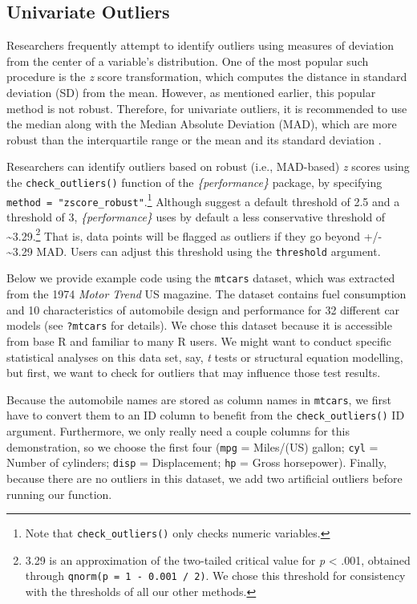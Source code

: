 \documentclass[sn-basic, lineno,pdflatex]{sn-jnl}
\begin{document}
\hypertarget{univariate-outliers}{%
\subsection{Univariate Outliers}\label{univariate-outliers}}

Researchers frequently attempt to identify outliers using measures of
deviation from the center of a variable's distribution. One of the most
popular such procedure is the \emph{z} score transformation, which
computes the distance in standard deviation (SD) from the mean. However,
as mentioned earlier, this popular method is not robust. Therefore, for
univariate outliers, it is recommended to use the median along with the
Median Absolute Deviation (MAD), which are more robust than the
interquartile range or the mean and its standard deviation
\citep{leys2019outliers, leys2013outliers}.

Researchers can identify outliers based on robust (i.e., MAD-based)
\emph{z} scores using the \texttt{check\_outliers()} function of the
\emph{\{performance\}} package, by specifying
\texttt{method\ =\ "zscore\_robust"}.\footnote{Note that
  \texttt{check\_outliers()} only checks numeric variables.} Although
\citet{leys2013outliers} suggest a default threshold of 2.5 and
\citet{leys2019outliers} a threshold of 3, \emph{\{performance\}} uses
by default a less conservative threshold of
\textasciitilde3.29.\footnote{3.29 is an approximation of the two-tailed
  critical value for \emph{p} \textless{} .001, obtained through
  \texttt{qnorm(p\ =\ 1\ -\ 0.001\ /\ 2)}. We chose this threshold for
  consistency with the thresholds of all our other methods.} That is,
data points will be flagged as outliers if they go beyond +/-
\textasciitilde3.29 MAD. Users can adjust this threshold using the
\texttt{threshold} argument.

Below we provide example code using the \texttt{mtcars} dataset, which
was extracted from the 1974 \emph{Motor Trend} US magazine. The dataset
contains fuel consumption and 10 characteristics of automobile design
and performance for 32 different car models (see \texttt{?mtcars} for
details). We chose this dataset because it is accessible from base R and
familiar to many R users. We might want to conduct specific statistical
analyses on this data set, say, \emph{t} tests or structural equation
modelling, but first, we want to check for outliers that may influence
those test results.

Because the automobile names are stored as column names in
\texttt{mtcars}, we first have to convert them to an ID column to
benefit from the \texttt{check\_outliers()} ID argument. Furthermore, we
only really need a couple columns for this demonstration, so we choose
the first four (\texttt{mpg} = Miles/(US) gallon; \texttt{cyl} = Number
of cylinders; \texttt{disp} = Displacement; \texttt{hp} = Gross
horsepower). Finally, because there are no outliers in this dataset, we
add two artificial outliers before running our function.
\end{document}
